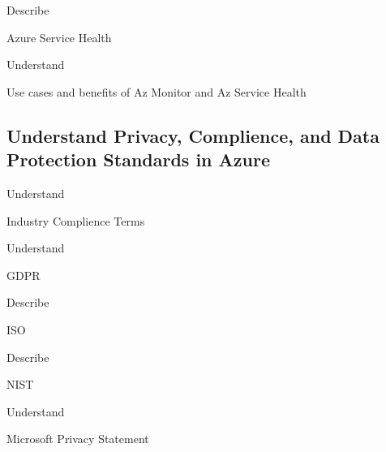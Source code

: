 \documentclass{scrartcl}
\newenvironment{flashcard}[2][]{%
    #1
    \vfill
    \centerline{\Large{#2}}
    \vfill
\newpage
}
{\newpage}
\newcommand{\subsectioncard}[1]{
    \vspace*{\stretch{1}}
    \subsection{#1}
    \vspace*{\stretch{1}}
    \pagebreak
}
\begin{document}
    \begin{flashcard}[Describe]{Azure Service Health}

    \end{flashcard}

    \begin{flashcard}[Understand]{Use cases and benefits of Az Monitor and Az Service Health}

    \end{flashcard}

    \subsectioncard{Understand Privacy, Complience, and Data Protection Standards in Azure}

    \begin{flashcard}[Understand]{Industry Complience Terms}

    \end{flashcard}

    \begin{flashcard}[Understand]{GDPR}

    \end{flashcard}

    \begin{flashcard}[Describe]{ISO}

    \end{flashcard}

    \begin{flashcard}[Describe]{NIST}

    \end{flashcard}

    \begin{flashcard}[Understand]{Microsoft Privacy Statement}

    \end{flashcard}
\end{document}
